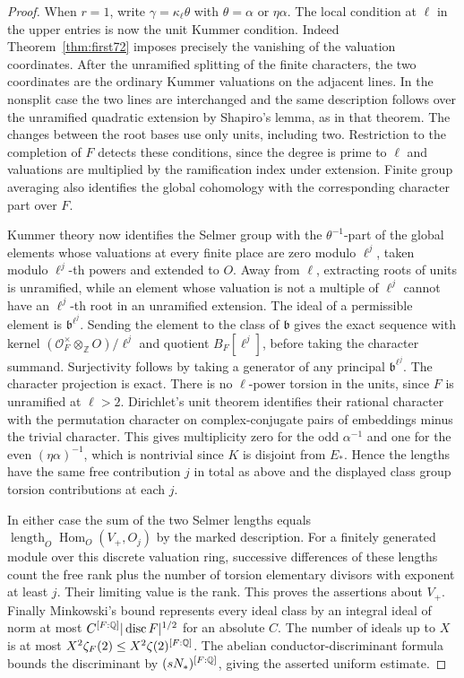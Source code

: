 \documentclass[a4paper,11pt]{article}
\theoremstyle{definition}
\theoremstyle{remark}
\newcommand{\ZZ}{\mathbb Z}\newcommand{\ord}{\operatorname{ord}}
\newcommand{\len}{\operatorname{length}}\newcommand{\Res}{\operatorname*{Res}}
\numberwithin{equation}{section}
\begin{document}
\begin{proof}
When \(r=1\), write \(\gamma=\kappa_\ell\theta\) with
\(\theta=\alpha\) or \(\eta\alpha\). The local condition at
\(\ell\) in the upper entries is now the unit Kummer condition.
Indeed Theorem~\ref{thm:first72} imposes precisely the vanishing
of the valuation coordinates. After the unramified splitting
of the finite characters, the two coordinates are the ordinary
Kummer valuations on the adjacent lines. In the nonsplit
case the two lines are interchanged and the same description
follows over the unramified quadratic extension by Shapiro's
lemma, as in that theorem. The changes between the root
bases use only units, including two. Restriction to the
completion of \(F\) detects these conditions, since the degree
is prime to \(\ell\) and valuations are multiplied by the
ramification index under extension. Finite group averaging
also identifies the global cohomology with the corresponding
character part over \(F\).

Kummer theory now identifies the Selmer group with the
\(\theta^{-1}\)-part of the global elements whose valuations
at every finite place are zero modulo \(\ell^j\), taken
modulo \(\ell^j\)-th powers and extended to \(O\).
Away from \(\ell\), extracting roots of units is unramified,
while an element whose valuation is not a multiple of \(\ell^j\)
cannot have an \(\ell^j\)-th root in an unramified extension.
The ideal of a permissible element is \(\mathfrak b^{\ell^j}\).
Sending the element to the class of \(\mathfrak b\) gives
the exact sequence with kernel
\((\mathcal O_F^\times\otimes_\ZZ O)/\ell^j\) and quotient
\(B_F[\ell^j]\), before taking the character summand.
Surjectivity follows by taking a generator of any principal
\(\mathfrak b^{\ell^j}\). The character projection is exact.
There is no \(\ell\)-power torsion in the units, since
\(F\) is unramified at \(\ell>2\).
Dirichlet's unit theorem identifies their rational character
with the permutation character on complex-conjugate pairs
of embeddings minus the trivial character. This gives
multiplicity zero for the odd \(\alpha^{-1}\) and one for
the even \((\eta\alpha)^{-1}\), which is nontrivial since
\(K\) is disjoint from \(E_*\). Hence the lengths have the
same free contribution \(j\) in total as above and the
displayed class group torsion contributions at each \(j\).

In either case the sum of the two Selmer lengths equals
\(\len_O\operatorname{Hom}_O(V_+,O_j)\) by the marked
description. For a finitely generated module over this
discrete valuation ring, successive differences of these
lengths count the free rank plus the number of torsion
elementary divisors with exponent at least \(j\).
Their limiting value is the rank. This proves the assertions
about \(V_+\). Finally Minkowski's bound represents every
ideal class by an integral ideal of norm at most
\(C^{[F:\mathbb Q]}|\operatorname{disc}F|^{1/2}\) for an absolute
\(C\). The number of ideals up to \(X\) is at most
\(X^2\zeta_F(2)\le X^2\zeta(2)^{[F:\mathbb Q]}\). The abelian
conductor-discriminant formula bounds the discriminant by
\((sN_*)^{[F:\mathbb Q]}\), giving the asserted uniform estimate.
\end{proof}
\end{document}
